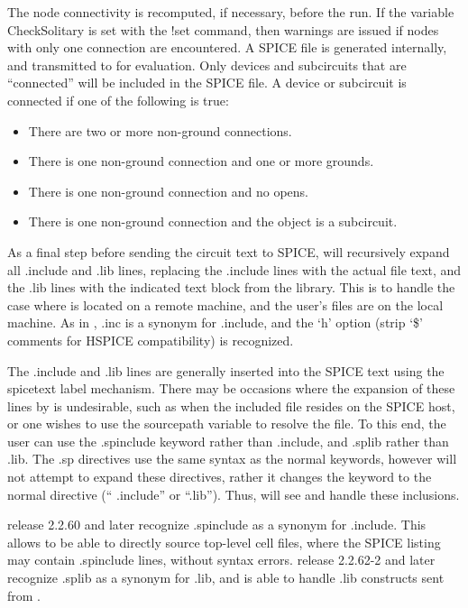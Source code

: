 The node connectivity is recomputed, if necessary, before the run.  If
the variable {\et CheckSolitary} is set with the {\cb !set} command,
then warnings are issued if nodes with only one connection are
encountered.  A SPICE file is generated internally, and transmitted to
{\WRspice} for evaluation.  Only devices and subcircuits that are
``connected'' will be included in the SPICE file.  A device or
subcircuit is connected if one of the following is true:
\begin{itemize}
\item{There are two or more non-ground connections.}
\item{There is one non-ground connection and one or more grounds.}
\item{There is one non-ground connection and no opens.}
\item{There is one non-ground connection and the object is a subcircuit.}
\end{itemize}

As a final step before sending the circuit text to SPICE, {\Xic} will
recursively expand all {\vt .include} and {\vt .lib} lines, replacing
the {\vt .include} lines with the actual file text, and the {\vt .lib}
lines with the indicated text block from the library.  This is to
handle the case where {\WRspice} is located on a remote machine, and
the user's files are on the local machine.  As in {\WRspice}, {\vt
.inc} is a synonym for {\vt .include}, and the `{\vt h}' option (strip
`\$' comments for HSPICE compatibility) is recognized.
 
The {\vt .include} and {\vt .lib} lines are generally inserted into
the SPICE text using the {\vt spicetext} label mechanism.  There may
be occasions where the expansion of these lines by {\Xic} is
undesirable, such as when the included file resides on the SPICE host,
or one wishes to use the {\WRspice} {\vt sourcepath} variable to
resolve the file.  To this end, the user can use the {\vt .spinclude}
keyword rather than {\vt .include}, and {\vt .splib} rather than {\vt
.lib}.  The {\vt .sp} directives use the same syntax as the normal
keywords, however {\Xic} will not attempt to expand these directives,
rather it changes the keyword to the normal directive (``{\vt
.include}'' or ``{\vt .lib}'').  Thus, {\WRspice} will see and handle
these inclusions.

{\WRspice} release 2.2.60 and later recognize {\vt .spinclude} as a
synonym for {\vt .include}.  This allows {\WRspice} to be able to
directly source top-level cell files, where the SPICE listing may
contain {\vt .spinclude} lines, without syntax errors.  {\WRspice}
release 2.2.62-2 and later recognize {\vt .splib} as a synonym for
{\vt .lib}, and is able to handle {\vt .lib} constructs sent from
{\Xic}.

